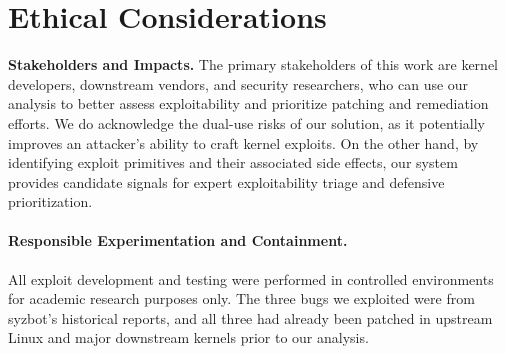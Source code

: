\section*{Ethical Considerations}

\noindent\textbf{Stakeholders and Impacts.}
The primary stakeholders of this work are kernel developers, downstream vendors, and security researchers, who can use our analysis to better assess exploitability and prioritize patching and remediation efforts.
We do acknowledge the dual-use risks of our solution, as it potentially improves an attacker's ability to craft kernel exploits. On the other hand,
by identifying exploit primitives and their associated side effects, our system provides candidate signals for expert exploitability triage and defensive prioritization.


\paragraph{Responsible Experimentation and Containment.}
All exploit development and testing were performed in controlled environments for academic research purposes only.
The three bugs we exploited were from syzbot's historical reports, and all three had already been patched in upstream Linux and major downstream kernels prior to our analysis.

